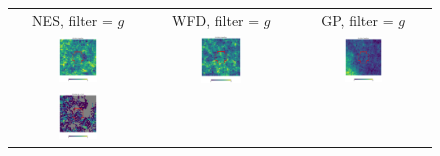 \documentclass[preprintm,linenumbers]{aastex631}
\begin{document}
  	\begin{figure}
			\centering
			\begin{tabular}{  c c c}
                 NES, filter = $g$ & WFD, filter = $g$ & GP, filter = $g$ \\
				\includegraphics[width=0.3\textwidth]{results/skymaps_cutout/skymaps_cutout_first_year_one_snap_v4_0_10yrs_db_noDD_noTwi_nside-256_CountMetric_g_NES_noDD_noTwi.pdf} &
				\includegraphics[width=0.3\textwidth]{results/skymaps_cutout/skymaps_cutout_first_year_one_snap_v4_0_10yrs_db_noDD_noTwi_nside-256_CountMetric_g_WFD_noDD_noTwi.pdf} &
				\includegraphics[width=0.3\textwidth]{results/skymaps_cutout/skymaps_cutout_first_year_one_snap_v4_0_10yrs_db_noDD_noTwi_nside-256_CountMetric_g_GP_noDD_noTwi.pdf} \\
				\includegraphics[width=0.3\textwidth]{results/skymaps_cutout/skymaps_cutout_first_year_one_snap_v4_0_10yrs_db_noDD_noTwi_tscale-14_nside-256_doAllTemplateMetrics_reduceCount_g_NES_noDD_noTwi.pdf} &

\end{tabular}
\end{figure}
\end{document}
